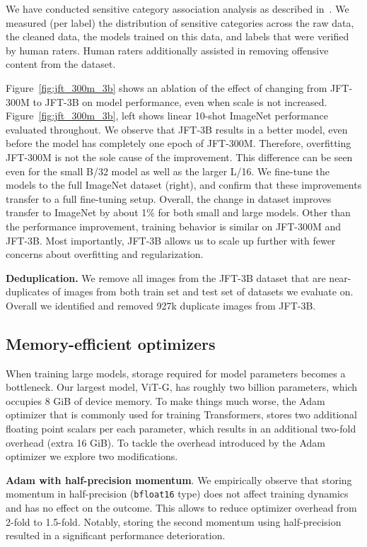 We have conducted sensitive category association analysis as described in~\cite{aka2021measuring}. We measured (per label) the distribution of sensitive categories across the raw data, the cleaned data, the models trained on this data, and labels that were verified by human raters. Human raters additionally assisted in removing offensive content from the dataset.

Figure~\ref{fig:jft_300m_3b} shows an ablation of the effect of changing from JFT-300M to JFT-3B on model performance, even when scale is not increased.
Figure~\ref{fig:jft_300m_3b}, left shows linear 10-shot ImageNet performance evaluated throughout.
We observe that JFT-3B  results in a better model, even before the model has completely one epoch of JFT-300M.
Therefore, overfitting JFT-300M is not the sole cause of the improvement.
This difference can be seen even for the small B/32 model as well as the larger L/16.
We fine-tune the models to the full ImageNet dataset (right), and confirm that these improvements transfer to a full fine-tuning setup.
Overall, the change in dataset improves transfer to ImageNet by about 1\% for both small and large models. 
Other than the performance improvement, training behavior is similar on JFT-300M and JFT-3B.
Most importantly, JFT-3B allows us to scale up further with fewer concerns about overfitting and regularization.

\textbf{Deduplication.} We remove all images from the JFT-3B dataset that are near-duplicates of images from both train set and test set of datasets we evaluate on. Overall we identified and removed 927k duplicate images from JFT-3B.


\subsection{Memory-efficient optimizers}\label{sec:optims}

When training large models, storage required for model parameters becomes a bottleneck. Our largest model, ViT-G, has roughly two billion parameters, which occupies 8 GiB of device memory. To make things much worse, the Adam optimizer that is commonly used for training Transformers, stores two additional floating point scalars per each parameter, which results in an additional two-fold overhead (extra 16 GiB). To tackle the overhead introduced by the Adam optimizer we explore two modifications.

\textbf{Adam with half-precision momentum}. We empirically observe that storing momentum in half-precision (\texttt{bfloat16} type) does not affect training dynamics and has no effect on the outcome. This allows to reduce optimizer overhead from 2-fold to 1.5-fold. Notably, storing the second momentum using half-precision resulted in a significant performance deterioration.

